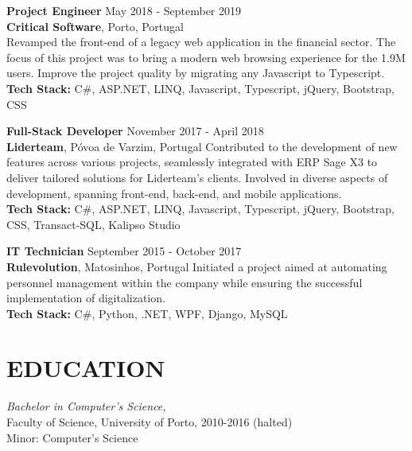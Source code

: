 \documentclass[margin, 10pt]{res} %
\begin{document}
\begin{resume}
    \textbf{Project Engineer} \hfill May 2018 - September 2019\\
    \textbf{Critical Software}, Porto, Portugal\\
    Revamped the front-end of a legacy web application in the financial sector. The focus of this project was to bring a modern web browsing experience for the 1.9M users. Improve the project quality by migrating any Javascript to Typescript.\\
    \textbf {Tech Stack:} C\#, ASP.NET, LINQ, Javascript, Typescript, jQuery, Bootstrap, CSS

    
    \textbf{Full-Stack Developer} \hfill November 2017 - April 2018\\
    \textbf{Liderteam}, Póvoa de Varzim, Portugal
    Contributed to the development of new features across various projects, seamlessly integrated with ERP Sage X3 to deliver tailored solutions for Liderteam's clients. Involved in diverse aspects of development, spanning front-end, back-end, and mobile applications.\\
    \textbf {Tech Stack:} C\#, ASP.NET, LINQ, Javascript, Typescript, jQuery, Bootstrap, CSS, Transact-SQL, Kalipso Studio

    
    \textbf{IT Technician} \hfill September 2015 - October 2017\\
    \textbf{Rulevolution}, Matosinhos, Portugal
    Initiated a project aimed at automating personnel management within the company while ensuring the successful implementation of digitalization.\\
    \textbf {Tech Stack:} C\#, Python, .NET, WPF, Django, MySQL



    \section{EDUCATION}

     {\sl Bachelor in Computer's Science,} \\
    Faculty of Science, University of Porto, 2010-2016 (halted)  \\
    Minor: Computer's Science



\end{resume}
\end{document}

